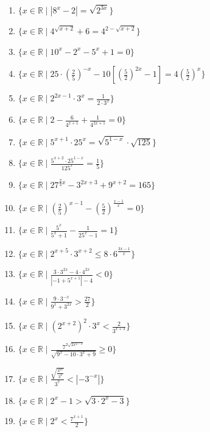 \documentclass[11pt,a4paper]{article}
\begin{document}
\begin{enumerate}
\item $\displaystyle \{x \in \mathbb{R} \mid \left| 8^{x} - 2 \right| = \sqrt{2^{3x}}\}$
\item $\displaystyle \{x \in \mathbb{R} \mid 4^{\sqrt{x+2}} + 6 = 4^{2 - \sqrt{x+2}}\}$
\item $\displaystyle \{x \in \mathbb{R} \mid 10^{x} - 2^{x} - 5^{x} + 1 = 0\}$
\item $\displaystyle \{x \in \mathbb{R} \mid 25 \cdot \left(\frac{2}{5}\right)^{-x} - 10\left[\left(\frac{5}{2}\right)^{2x} - 1\right] = 4\left(\frac{5}{2}\right)^{x}\}$
\item $\displaystyle \{x \in \mathbb{R} \mid 2^{2x-1} \cdot 3^{x} = \frac{1}{2 \cdot 3^{x}}\}$
\item $\displaystyle \{x \in \mathbb{R} \mid 2 - \frac{6}{4^{x+1}} + \frac{1}{4^{2x+1}} = 0\}$
\item $\displaystyle \{x \in \mathbb{R} \mid 5^{x+1} \cdot 25^{x} = \sqrt{5^{1-x}} \cdot \sqrt{125}\}$
\item $\displaystyle \{x \in \mathbb{R} \mid \frac{5^{x+2} \cdot 25^{1-x}}{125^{x}} = \frac{1}{5}\}$
\item $\displaystyle \{x \in \mathbb{R} \mid 27^{\frac{2}{3}x} - 3^{2x+3} + 9^{x+2} = 165\}$
\item $\displaystyle \{x \in \mathbb{R} \mid \left(\frac{2}{5}\right)^{x-1} - \left(\frac{5}{2}\right)^{\frac{x-1}{x}} = 0\}$
\item $\displaystyle \{x \in \mathbb{R} \mid \frac{5^{x}}{5^{x} + 1} - \frac{1}{25^{x} - 1} = 1\}$
\item $\displaystyle \{x \in \mathbb{R} \mid 2^{x+5} \cdot 3^{x+2} \le 8 \cdot 6^{\frac{3x-1}{x}}\}$
\item $\displaystyle \{x \in \mathbb{R} \mid \frac{3 \cdot 3^{2x} - 4 \cdot 4^{2x}}{\left| -1 + 5^{x+1} \right| - 4} < 0\}$
\item $\displaystyle \{x \in \mathbb{R} \mid \frac{9 \cdot 3^{-x}}{9^{x} + 3^{2x}} > \frac{27}{2}\}$
\item $\displaystyle \{x \in \mathbb{R} \mid (2^{x+2})^{2} \cdot 3^{x} < \frac{2}{3^{x+3}}\}$
\item $\displaystyle \{x \in \mathbb{R} \mid \frac{7^{2\sqrt{2x^{2-x}}}}{\sqrt{9^{x} - 10 \cdot 3^{x} + 9}} \ge 0\}$
\item $\displaystyle \{x \in \mathbb{R} \mid \frac{\sqrt{\frac{3^{6x}}{3^{2}}}}{3^{7}} < \left| -3^{-x} \right|\}$
\item $\displaystyle \{x \in \mathbb{R} \mid 2^{x} - 1 > \sqrt{3 \cdot 2^{x} - 3}\}$
\item $\displaystyle \{x \in \mathbb{R} \mid 2^{x} < \frac{7^{x+1}}{2}\}$

\end{enumerate}
\end{document}
